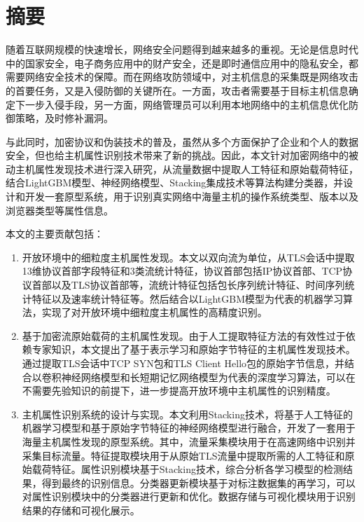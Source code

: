\maketitle%
\MAKETITLE%
\makedeclaration%
\intobmk\chapter*{摘\quad 要}%
\setcounter{page}{1}%

随着互联网规模的快速增长，网络安全问题得到越来越多的重视。无论是信息时代中的国家安全，电子商务应用中的财产安全，还是即时通信应用中的隐私安全，都需要网络安全技术的保障。而在网络攻防领域中，对主机信息的采集既是网络攻击的首要任务，又是入侵防御的关键所在。一方面，攻击者需要基于目标主机信息确定下一步入侵手段，另一方面，网络管理员可以利用本地网络中的主机信息优化防御策略，及时修补漏洞。

与此同时，加密协议和伪装技术的普及，虽然从多个方面保护了企业和个人的数据安全，但也给主机属性识别技术带来了新的挑战。因此，本文针对加密网络中的被动主机属性发现技术进行深入研究，从流量数据中提取人工特征和原始载荷特征，结合LightGBM模型、神经网络模型、Stacking集成技术等算法构建分类器，并设计和开发一套原型系统，用于识别真实网络中海量主机的操作系统类型、版本以及浏览器类型等属性信息。

本文的主要贡献包括：
\begin{enumerate}
\item
开放环境中的细粒度主机属性发现。本文以双向流为单位，从TLS会话中提取13维协议首部字段特征和3类流统计特征，协议首部包括IP协议首部、TCP协议首部以及TLS协议首部等，流统计特征包括包长序列统计特征、时间序列统计特征以及速率统计特征等。然后结合以LightGBM模型为代表的机器学习算法，实现了对开放环境中细粒度主机属性的高精度识别。
\item
基于加密流原始载荷的主机属性发现。由于人工提取特征方法的有效性过于依赖专家知识，本文提出了基于表示学习和原始字节特征的主机属性发现技术。通过提取TLS会话中TCP SYN包和TLS Client Hello包的原始字节信息，并结合以卷积神经网络模型和长短期记忆网络模型为代表的深度学习算法，可以在不需要先验知识的前提下，进一步提高开放环境中主机属性的识别精度。
\item
主机属性识别系统的设计与实现。本文利用Stacking技术，将基于人工特征的机器学习模型和基于原始字节特征的神经网络模型进行融合，开发了一套用于海量主机属性发现的原型系统。其中，流量采集模块用于在高速网络中识别并采集目标流量。特征提取模块用于从原始TLS流量中提取所需的人工特征和原始载荷特征。属性识别模块基于Stacking技术，综合分析各学习模型的检测结果，得到最终的识别信息。分类器更新模块基于对标注数据集的再学习，可以对属性识别模块中的分类器进行更新和优化。数据存储与可视化模块用于识别结果的存储和可视化展示。
\end{enumerate}

